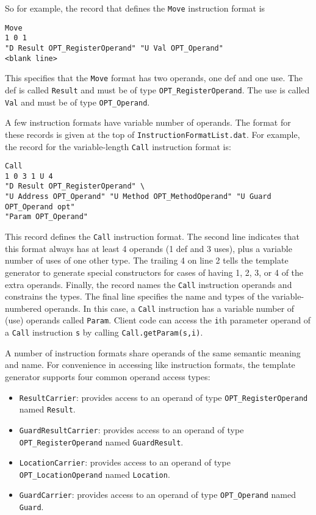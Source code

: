 So for example, the record that defines the {\tt Move} instruction format
is
\begin{verbatim}
Move
1 0 1
"D Result OPT_RegisterOperand" "U Val OPT_Operand"
<blank line>
\end{verbatim}

This specifies that the {\tt Move} format has two operands, one def and one
use.  The def is called {\tt Result} and must be of
type {\tt OPT\_RegisterOperand}.
The use is called {\tt Val} and must be of type {\tt OPT\_Operand}.

A few instruction formats have variable number of operands.  The
format for these records is given at the top of {\tt InstructionFormatList.dat}.
For example, the record for the variable-length {\tt Call} instruction
format is: 
\begin{verbatim}
Call
1 0 3 1 U 4
"D Result OPT_RegisterOperand" \
"U Address OPT_Operand" "U Method OPT_MethodOperand" "U Guard OPT_Operand opt"
"Param OPT_Operand"
\end{verbatim}
This record defines the {\tt Call} instruction format.  The second line
indicates that this format always has at least 4 operands (1 def and 3 uses),
plus a variable number of uses of one other type.  The trailing
4 on line 2 tells the template generator to generate special constructors
for cases of having 1, 2, 3, or 4 of the extra operands.
Finally, the record names the {\tt Call} instruction operands and
constrains the types.  The final line specifies the name and
types of the variable-numbered operands.  In this case, a {\tt Call}
instruction has a variable number of (use) operands called {\tt Param}.
Client code can access the {\tt i}th parameter operand of a {\tt Call}
instruction {\tt s} by calling {\tt Call.getParam(s,i)}.

A number of instruction formats share operands of 
the same semantic meaning and name.  For convenience in accessing
like instruction formats, the template generator supports four
common operand access types:
\begin{itemize}
\item {\tt ResultCarrier}: provides access to an operand of type {\tt OPT\_RegisterOperand} named {\tt Result}.
\item {\tt GuardResultCarrier}: provides access to an operand of type {\tt OPT\_RegisterOperand} named {\tt GuardResult}.
\item {\tt LocationCarrier}: provides access to an operand of type {\tt OPT\_LocationOperand} named {\tt Location}.
\item {\tt GuardCarrier}: provides access to an operand of type {\tt OPT\_Operand} named {\tt Guard}.
\end{itemize}

